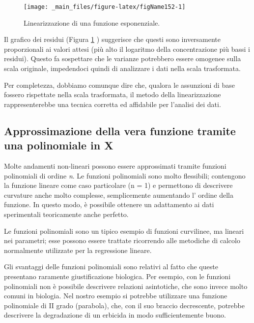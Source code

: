 \documentclass[a4paper,12pt,oneside]{book}
\begin{document}
\begin{figure}

{\centering \texttt{[image: \_main\_files/figure-latex/figName152-1]} 

}

\caption{Linearizzazione di una funzione esponenziale.}\label{fig:figName152}
\end{figure}

Il grafico dei residui (Figura \ref{fig:figName152} ) suggerisce che questi sono inversamente proporzionali ai valori attesi (più alto il logaritmo della concentrazione più bassi i residui). Questo fa sospettare che le varianze potrebbero essere omogenee sulla scala originale, impedendoci quindi di analizzare i dati nella scala trasformata.

Per completezza, dobbiamo comunque dire che, qualora le assunzioni di base fossero rispettate nella scala trasformata, il metodo della linearizzazione rappresenterebbe una tecnica corretta ed affidabile per l'analisi dei dati.

\hypertarget{approssimazione-della-vera-funzione-tramite-una-polinomiale-in-x}{%
\subsection{Approssimazione della vera funzione tramite una polinomiale in X}\label{approssimazione-della-vera-funzione-tramite-una-polinomiale-in-x}}

Molte andamenti non-lineari possono essere approssimati tramite funzioni polinomiali di ordine \textit{n}. Le funzioni polinomiali sono molto flessibili; contengono la funzione lineare come caso particolare (n = 1) e permettono di descrivere curvature anche molto complesse, semplicemente aumentando l' ordine della funzione. In questo modo, è possibile ottenere un adattamento ai dati sperimentali teoricamente anche perfetto.

Le funzioni polinomiali sono un tipico esempio di funzioni curvilinee, ma lineari nei parametri; esse possono essere trattate ricorrendo alle metodiche di calcolo normalmente utilizzate per la regressione lineare.

Gli svantaggi delle funzioni polinomiali sono relativi al fatto che queste presentano raramente giustificazione biologica. Per esempio, con le funzioni polinomiali non è possibile descrivere relazioni asintotiche, che sono invece molto comuni in biologia. Nel nostro esempio si potrebbe utilizzare una funzione polinomiale di II grado (parabola), che, con il suo braccio decrescente, potrebbe descrivere la degradazione di un erbicida in modo sufficientemente buono.
\end{document}
